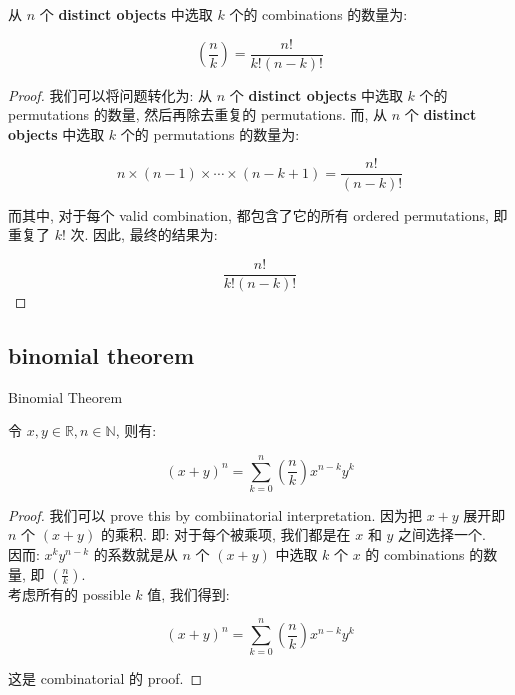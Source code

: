 \documentclass{qlnotes-export}
\begin{document}
\begin{proposition}\label{prop-01-combinatorics-prob-space-proposition-002}

从 \(n\) 个 \textbf{distinct objects} 中选取 \(k\) 个的 combinations 的数量为:

\[\left( \frac{n}{k} \right) = \frac{n!}{k!(n - k)!}\]

\end{proposition}

\begin{proof}

我们可以将问题转化为: 从 \(n\) 个 \textbf{distinct objects} 中选取 \(k\) 个的 permutations 的数量, 然后再除去重复的 permutations. 而, 从 \(n\) 个 \textbf{distinct objects} 中选取 \(k\) 个的 permutations 的数量为:

\[n \times (n - 1) \times \cdots \times (n - k + 1) = \frac{n!}{(n - k)!}\]

而其中, 对于每个 valid combination, 都包含了它的所有 ordered permutations, 即重复了 \(k!\) 次. 因此, 最终的结果为:

\[\frac{n!}{k!(n - k)!}\]

\end{proof}

\subsection{binomial theorem}\label{binomial-theorem}

\begin{theorem}{Binomial Theorem}\label{thm-01-combinatorics-prob-space-binomial-theorem}

令 \(x,y \in {\mathbb{R}},n \in {\mathbb{N}}\), 则有:

\[(x + y)^{n} = \sum\limits_{k = 0}^{n}\left( \frac{n}{k} \right)x^{n - k}y^{k}\]

\end{theorem}

\begin{proof}

我们可以 prove this by combiinatorial interpretation. 因为把 \(x + y\) 展开即 \(n\) 个 \((x + y)\) 的乘积. 即: 对于每个被乘项, 我们都是在 \(x\) 和 \(y\) 之间选择一个.\\
因而: \(x^{k}y^{n - k}\) 的系数就是从 \(n\) 个 \((x + y)\) 中选取 \(k\) 个 \(x\) 的 combinations 的数量, 即 \(\left( \frac{n}{k} \right)\).\\
考虑所有的 possible \(k\) 值, 我们得到:

\[(x + y)^{n} = \sum\limits_{k = 0}^{n}\left( \frac{n}{k} \right)x^{n - k}y^{k}\]

这是 combinatorial 的 proof.

\end{proof}
\end{document}
